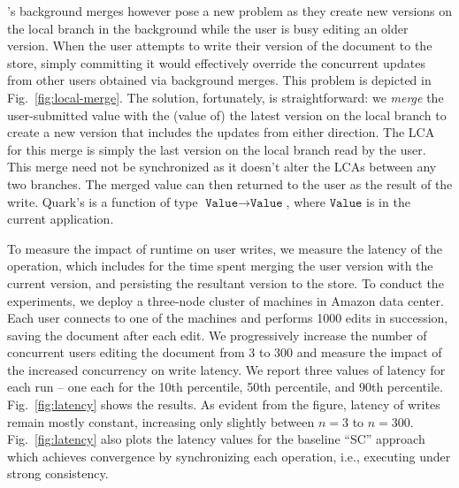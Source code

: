\quark's background merges however pose a new problem as they create
new versions on the local branch in the background while the user is
busy editing an older version. When the user attempts to write their
version of the document to the store, simply committing it would
effectively override the concurrent updates from other users obtained
via background merges. This problem is depicted in
Fig.~\ref{fig:local-merge}. The solution, fortunately, is
straightforward: we \emph{merge} the user-submitted value with the
(value of) the latest version on the local branch to create a new
version that includes the updates from either direction. The LCA for
this merge is simply the last version on the local branch read by the
user. This merge need not be synchronized as it doesn't alter the LCAs
between any two branches. The merged value can then returned
to the user as the result of the write.  Quark's  is a
function of type $\texttt{Value} \rightarrow \texttt{Value}$, where
$\texttt{Value}$ is  in the current application.

To measure the impact of \quark runtime on user writes, we measure the
latency of the  operation, which includes for the time spent
merging the user version with the current version, and persisting the
resultant version to the store. To conduct the experiments, we deploy
a three-node cluster of  machines in Amazon 
data center. Each user connects to one of the machines and performs
1000 edits in succession, saving the document after each edit. We
progressively increase the number of concurrent users editing the
document from 3 to 300 and measure the impact of the increased
concurrency on write latency. We report three values of latency for
each run -- one each for the 10th percentile, 50th percentile, and
90th percentile.  Fig.~\ref{fig:latency} shows the results. As evident
from the figure, latency of \quark writes remain mostly constant,
increasing only slightly between $n=3$ to $n=300$.
Fig.~\ref{fig:latency} also plots the latency values for the baseline
``SC'' approach which achieves convergence by synchronizing each
operation, i.e., executing under strong consistency.

